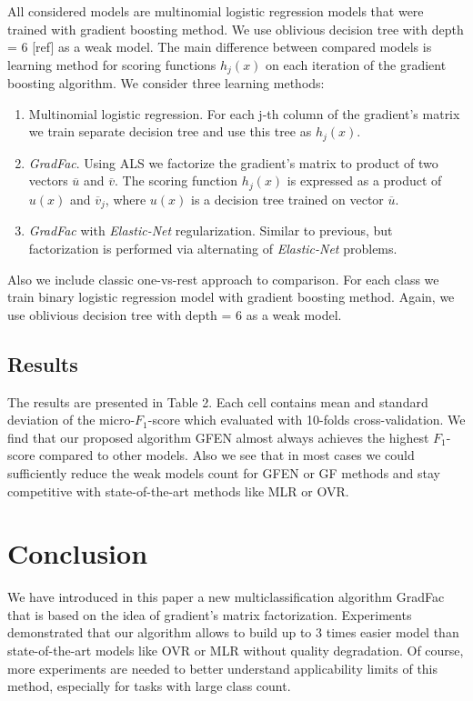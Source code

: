 \documentclass{article}
\begin{document}
All considered models are multinomial logistic regression models that were trained with gradient boosting method. We use oblivious decision tree with depth = 6 [ref] as a weak model. The main difference between compared models is learning method for scoring functions $h_{j}(x)$ on each iteration of the gradient boosting algorithm. We consider three learning methods:
\begin{enumerate}
	\item Multinomial logistic regression. For each j-th column of the gradient's matrix we train separate decision tree and use this tree as $h_{j}(x)$.

	\item \emph{GradFac}. Using ALS we factorize the gradient's matrix to product of two vectors $\overline{u}$ and $\overline{v}$. The scoring function $h_{j}(x)$ is expressed as a product of $u(x)$ and $\overline{v}_{j}$, where $u(x)$ is a decision tree trained on vector $\overline{u}$.

	\item \emph{GradFac} with \emph{Elastic-Net} regularization. Similar to previous, but factorization is performed via alternating of \emph{Elastic-Net} problems.
\end{enumerate}
Also we include classic one-vs-rest approach to comparison. For each class we train binary logistic regression model with gradient boosting method. Again, we use oblivious decision tree with depth = 6 as a  weak model.


\subsection{Results}

The results are presented in Table 2. Each cell contains mean and standard deviation of the micro-$F_1$-score which evaluated with 10-folds cross-validation. We find that our proposed algorithm GFEN almost always achieves the highest $F_1$-score compared to other models. Also we see that in most cases we could sufficiently reduce the weak models count for GFEN or GF methods and stay competitive with state-of-the-art methods like MLR or OVR.


\section{Conclusion}
We have introduced in this paper a new multiclassification algorithm GradFac that is based on the idea of gradient's matrix factorization. Experiments demonstrated that our algorithm allows to build up to 3 times easier model than state-of-the-art models like OVR or MLR without quality degradation. Of course, more experiments are needed to better understand applicability limits of this method, especially for tasks with large class count.
\end{document}
